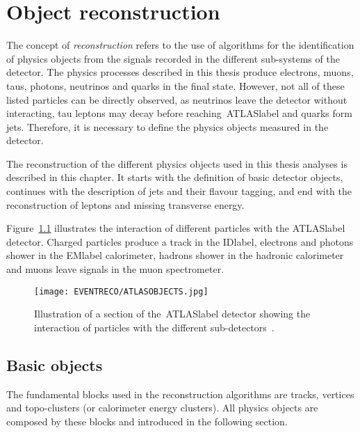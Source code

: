 \chapter{Object reconstruction}
\label{chapter:EventReco}

The concept of \textit{reconstruction} refers to the use of algorithms for the identification of physics objects from the signals recorded in the different sub-systems of the detector. The physics processes described in this thesis produce electrons, muons, taus, photons, neutrinos and quarks in the final state. However, not all of these listed particles can be directly observed, as neutrinos leave the detector without interacting, tau leptons may decay before reaching~\acrshort{ATLASlabel} and quarks form jets. Therefore, it is necessary to define the physics objects measured in the detector.

The reconstruction of the different physics objects used in this thesis analyses is described in this chapter. It starts with the definition of basic detector objects, continues with the description of jets and their flavour tagging, and end with the reconstruction of leptons and missing transverse energy.

Figure~\ref{figEVNTRECO:ATLASOBJECTS} illustrates the interaction of different particles with the \acrshort{ATLASlabel} detector. Charged particles produce a track in the \acrshort{IDlabel}, electrons and photons shower in the \acrshort{EMlabel} calorimeter, hadrons shower in the hadronic calorimeter and muons leave signals in the muon spectrometer.



\begin{figure}[htbp]
     \RawFloats
     \begin{center}
     \texttt{[image: EVENTRECO/ATLASOBJECTS.jpg]}
     \caption{
         Illustration of a section of the~\acrshort{ATLASlabel} detector showing the interaction of particles with the different sub-detectors~\cite{Pequenao:1505342}. 
     }
     \label{figEVNTRECO:ATLASOBJECTS}
     \end{center}
 \end{figure}

\clearpage

\section{Basic objects}

The fundamental blocks used in the reconstruction algorithms are tracks, vertices and topo-clusters (or calorimeter energy clusters). All physics objects are composed by these blocks and introduced in the following section.

